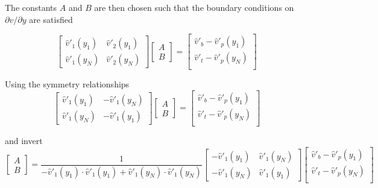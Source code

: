 \documentclass[titlepage,12pt,letter]{article}
\numberwithin{equation}{section}
\begin{document}
The constants $A$ and $B$ are then chosen such that the boundary conditions on $\partial v / \partial y$ are satisfied

\begin{equation*}
	\renewcommand{\arraystretch}{2}
\begin{bmatrix}
	\hat{v}'_1\left(y_{1}\right) & \hat{v}'_2\left(y_{1}\right) \\
	\hat{v}'_1\left(y_{N}\right) & \hat{v}'_2\left(y_{N}\right)
\end{bmatrix}
\begin{bmatrix}
	A\\ B
\end{bmatrix}
=
\begin{bmatrix}
	\hat{v}'_b-\hat{v}'_p\left(y_{1}\right) \\
	\hat{v}'_t-\hat{v}'_p\left(y_{N}\right) \\
\end{bmatrix}
\end{equation*}

Using the symmetry relationships
\begin{equation*}
	\renewcommand{\arraystretch}{2}
	\begin{bmatrix}
		\hat{v}'_1\left(y_{1}\right) & -\hat{v}'_1\left(y_{N}\right) \\
		\hat{v}'_1\left(y_{N}\right) & -\hat{v}'_1\left(y_{1}\right)
	\end{bmatrix}
	\begin{bmatrix}
		A\\ B
	\end{bmatrix}
	=
	\begin{bmatrix}
		\hat{v}'_b-\hat{v}'_p\left(y_{1}\right) \\
		\hat{v}'_t-\hat{v}'_p\left(y_{N}\right) \\
	\end{bmatrix}
\end{equation*}

and invert
\begin{equation}
	\renewcommand{\arraystretch}{2}
	\begin{bmatrix}
		A\\ B
	\end{bmatrix}
	=\frac{1}{-\hat{v}'_1(y_1)\cdot \hat{v}'_1(y_1)+ \hat{v}'_1(y_N)\cdot \hat{v}'_1(y_N)}
	\begin{bmatrix}
		-\hat{v}'_1\left(y_{1}\right)& \hat{v}'_1\left(y_{N}\right) \\
		-\hat{v}'_1\left(y_{N}\right) &	\hat{v}'_1\left(y_{1}\right) 
	\end{bmatrix}
	\begin{bmatrix}
	\hat{v}'_b-\hat{v}'_p\left(y_{1}\right) \\
	\hat{v}'_t-\hat{v}'_p\left(y_{N}\right) \\
\end{bmatrix} \label{eq:AB}
\end{equation}
\end{document}
